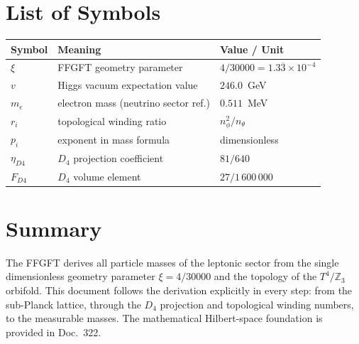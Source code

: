 
\section*{List of Symbols}

\begin{center}
\begin{tabular}{lll}
\toprule
Symbol & Meaning & Value / Unit \\
\midrule
$\xi$        & FFGFT geometry parameter              & $4/30000 = 1.3\overline{3}\times10^{-4}$ \\
$v$          & Higgs vacuum expectation value        & $246.0$~GeV \\
$m_e$        & electron mass (neutrino sector ref.)  & $0.511$~MeV \\
$r_i$        & topological winding ratio             & $n_\phi^2/n_\theta$ \\
$p_i$        & exponent in mass formula              & dimensionless \\
$\eta_{D4}$  & $D_4$ projection coefficient          & $81/640$ \\
$F_{D4}$     & $D_4$ volume element                  & $27/1\,600\,000$ \\
\bottomrule
\end{tabular}
\end{center}



\section*{Summary}

The FFGFT derives all particle masses of the leptonic sector from
the single dimensionless geometry parameter $\xi = 4/30000$ and the
topology of the $T^4/\mathbb{Z}_3$ orbifold. This document follows
the derivation explicitly in every step: from the sub-Planck lattice,
through the $D_4$ projection and topological winding numbers, to the
measurable masses. The mathematical Hilbert-space foundation is provided
in Doc.~322.

